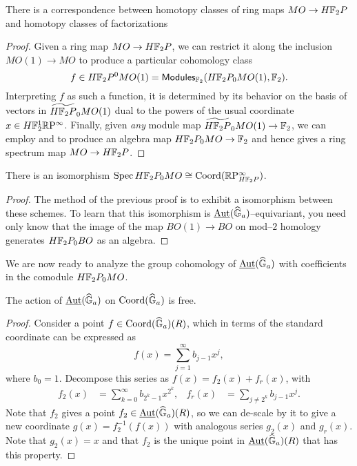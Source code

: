 \begin{corollary}
There is a correspondence between homotopy classes of ring maps $MO \to H\mathbb F_2P$ and homotopy classes of factorizations
\begin{center}
\end{center}
\end{corollary}
\begin{proof}
Given a ring map $MO \to H\mathbb F_2P$, we can restrict it along the inclusion $MO(1) \to MO$ to produce a particular cohomology class \[f \in H\mathbb F_2P^0 MO(1) = \mathsf{Modules}_{\mathbb F_2}(H\mathbb F_2P_0 MO(1), \mathbb F_2).\]  Interpreting $f$ as such a function, it is determined by its behavior on the basis of vectors in $\widetilde{H\mathbb F_2P}_0 MO(1)$ dual to the powers of the usual coordinate $x \in H\mathbb F_2^1 \mathbb R\mathrm P^\infty$.  Finally, given \emph{any} module map $\widetilde{H\mathbb F_2P}_0 MO(1) \to \mathbb F_2$, we can employ  and to produce an algebra map $H\mathbb F_2P_0 MO \to \mathbb F_2$ and hence  gives a ring spectrum map $MO \to H\mathbb F_2P$.
\end{proof}

\begin{corollary}
There is an isomorphism $\operatorname{Spec} H\mathbb F_2P_0 MO \cong \operatorname{Coord}(\mathbb R\mathrm P^\infty_{H\mathbb F_2P})$.
\end{corollary}
\begin{proof}
The method of the previous proof is to exhibit a isomorphism between these schemes.  To learn that this isomorphism is $\operatorname{\underline{\smash{\operatorname{Aut}}}}(\widehat{\mathbb G}_a)$--equivariant, you need only know that the image of the map $BO(1) \to BO$ on mod--$2$ homology generates $H\mathbb F_2P_0 BO$ as an algebra.
\end{proof}

We are now ready to analyze the group cohomology of $\operatorname{\underline{\smash{\operatorname{Aut}}}}(\widehat{\mathbb G}_a)$ with coefficients in the comodule $H\mathbb F_2P_0 MO$.
\begin{theorem}
The action of $\operatorname{\underline{\smash{\operatorname{Aut}}}}(\widehat{\mathbb G}_a)$ on $\operatorname{Coord}(\widehat{\mathbb G}_a)$ is free.
\end{theorem}
\begin{proof}
Consider a point $f \in \operatorname{Coord}(\widehat{\mathbb G}_a)(R)$, which in terms of the standard coordinate can be expressed as \[f(x) = \sum_{j=1}^\infty b_{j-1} x^j,\] where $b_0 = 1$.  Decompose this series as $f(x) = f_2(x) + f_r(x)$, with
\begin{align*}
f_2(x) & = \sum_{k=0}^\infty b_{2^k-1} x^{2^k}, &
f_r(x) & = \sum_{j \ne 2^k} b_{j-1} x^j.
\end{align*}
Note that $f_2$ gives a point $f_2 \in \operatorname{\underline{\smash{\operatorname{Aut}}}}(\widehat{\mathbb G}_a)(R)$, so we can de-scale by it to give a new coordinate $g(x) = f_2^{-1}(f(x))$ with analogous series $g_2(x)$ and $g_r(x)$.  Note that $g_2(x) = x$ and that $f_2$ is the unique point in $\operatorname{\underline{\smash{\operatorname{Aut}}}}(\widehat{\mathbb G}_a)(R)$ that has this property.
\end{proof}

